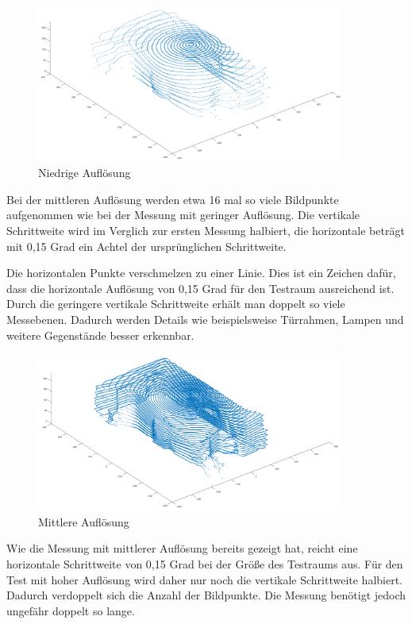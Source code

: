 \begin{figure}[H]
	\centering
	\includegraphics[width=0.9\textwidth]{images/Validierung/Aufloesungen/niedrig.png}
	\caption{Niedrige Auflösung}
	\label{niedrig}
\end{figure}


Bei der mittleren Auflösung werden etwa 16 mal so viele Bildpunkte aufgenommen wie bei der Messung mit geringer Auflösung. Die vertikale Schrittweite wird im Verglich zur ersten Messung halbiert, die horizontale beträgt mit 0,15 Grad ein Achtel der ursprünglichen Schrittweite. 

Die horizontalen Punkte verschmelzen zu einer Linie. Dies ist ein Zeichen dafür, dass die horizontale Auflösung von 0,15 Grad für den Testraum ausreichend ist. Durch die geringere vertikale Schrittweite erhält man doppelt so viele Messebenen. Dadurch werden Details wie beispielsweise Türrahmen, Lampen und weitere Gegenstände besser erkennbar. 


\begin{figure}[H]
	\centering
	\includegraphics[width=0.9\textwidth]{images/Validierung/Aufloesungen/mittel.png}
	\caption{Mittlere Auflösung}
	\label{mittel}
\end{figure}

Wie die Messung mit mittlerer Auflösung bereits gezeigt hat, reicht eine horizontale Schrittweite von 0,15 Grad bei der Größe des Testraums aus. Für den Test mit hoher Auflösung wird daher nur noch die vertikale Schrittweite halbiert. Dadurch verdoppelt sich die Anzahl der Bildpunkte. Die Messung benötigt jedoch ungefähr doppelt so lange.

